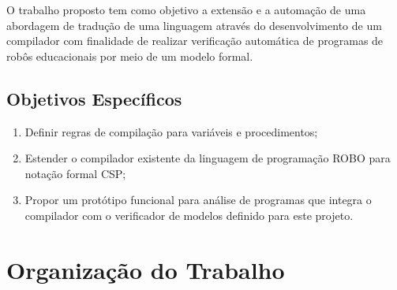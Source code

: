 O trabalho proposto tem como objetivo a extensão e a automação de uma abordagem de tradução de uma linguagem através do desenvolvimento de um compilador com finalidade de realizar verificação automática de programas de robôs educacionais por meio de um modelo formal.

\subsection{Objetivos Específicos}

\begin{enumerate}
    \item Definir regras de compilação para variáveis e procedimentos;
    \item Estender o compilador existente da linguagem de programação ROBO para notação formal CSP;
    \item Propor um protótipo funcional para análise de programas que integra o compilador com o verificador de modelos definido para este projeto.

\end{enumerate}

\section{Organização do Trabalho}